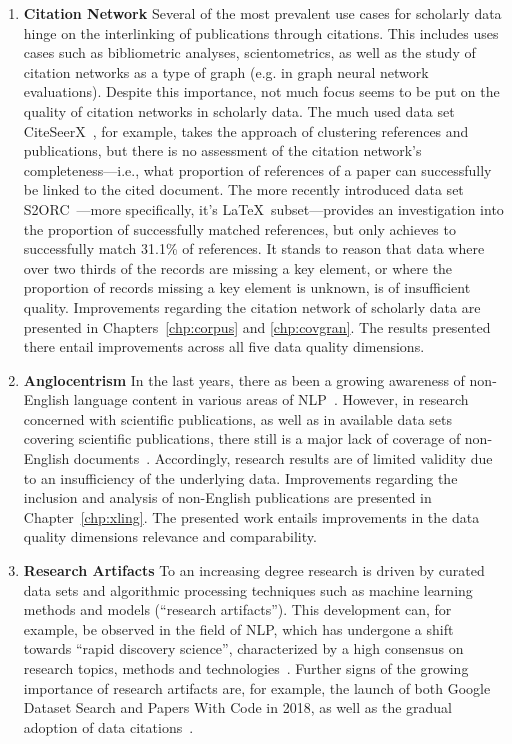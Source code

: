 \begin{enumerate}
    \item \textbf{Citation Network} Several of the most prevalent use cases for scholarly data hinge on the interlinking of publications through citations. This includes uses cases such as bibliometric analyses, scientometrics, as well as the study of citation networks as a type of graph (e.g. in graph neural network evaluations). Despite this importance, not much focus seems to be put on the quality of citation networks in scholarly data. The much used data set CiteSeerX~\cite{Wu2015,Wu2016,Patel2021}, for example, takes the approach of clustering references and publications, but there is no assessment of the citation network's completeness---i.e., what proportion of references of a paper can successfully be linked to the cited document. The more recently introduced data set S2ORC~\cite{Lo2020}---more specifically, it's \LaTeX\ subset---provides an investigation into the proportion of successfully matched references, but only achieves to successfully match 31.1\% of references.
It stands to reason that data where over two thirds of the records are missing a key element, or where the proportion of records missing a key element is unknown, is of insufficient quality.
Improvements regarding the citation network of scholarly data are presented in Chapters~\ref{chp:corpus} and \ref{chp:covgran}. The results presented there entail improvements across all five data quality dimensions.
    \item \textbf{Anglocentrism} In the last years, there as been a growing awareness of non-English language content in various areas of NLP~\cite{Dabre2020,Yu2022,Ramesh2023}. However, in research concerned with scientific publications, as well as in available data sets covering scientific publications, there still is a major lack of coverage of non-English documents~\cite{Vera-Baceta2019,Liu2019,Moed2018,Moskaleva2019,MartinMartin2021}.
Accordingly, research results are of limited validity due to an insufficiency of the underlying data.
Improvements regarding the inclusion and analysis of non-English publications are presented in Chapter~\ref{chp:xling}. The presented work entails improvements in the data quality dimensions relevance and comparability.
    \item \textbf{Research Artifacts} To an increasing degree research is driven by curated data sets and algorithmic processing techniques such as machine learning methods and models (``research artifacts''). This development can, for example, be observed in the field of NLP, which has undergone a shift towards ``rapid discovery science'', characterized by a high consensus on research topics, methods and technologies~\cite{Jurgens2018}. Further signs of the growing importance of research artifacts are, for example, the launch of both Google Dataset Search and Papers With Code in 2018, as well as the gradual adoption of data citations~\cite{Kratz2015}.

\end{enumerate}
